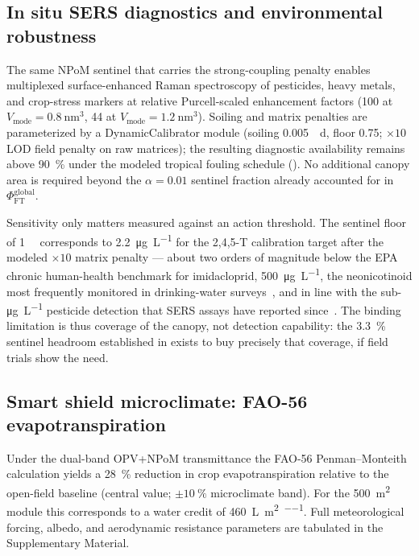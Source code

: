 \documentclass[preprint,12pt]{elsarticle}
\begin{document}
\subsection{In situ SERS diagnostics and environmental robustness}
The same NPoM sentinel that carries the strong-coupling penalty enables multiplexed surface-enhanced Raman spectroscopy of pesticides, heavy metals, and crop-stress markers at relative Purcell-scaled enhancement factors (\num{100} at $V_{\mathrm{mode}} = \qty{0.8}{\nm\cubed}$, \num{44} at $V_{\mathrm{mode}} = \qty{1.2}{\nm\cubed}$). Soiling and matrix penalties are parameterized by a DynamicCalibrator module (soiling \qty{0.005}{\per\day}, floor \num{0.75}; $\times 10$ LOD field penalty on raw matrices); the resulting diagnostic availability remains above \qty{90}{\percent} under the modeled tropical fouling schedule (). No additional canopy area is required beyond the $\alpha=0.01$ sentinel fraction already accounted for in $\Phi_{\mathrm{FT}}^{\mathrm{global}}$.

Sensitivity only matters measured against an action threshold. The sentinel floor of \qty{1}{\nano\molar} corresponds to \SI{2.2}{\micro\gram\per\liter} for the 2,4,5-T calibration target after the modeled $\times 10$ matrix penalty --- about two orders of magnitude below the EPA chronic human-health benchmark for imidacloprid, \SI{500}{\micro\gram\per\liter}, the neonicotinoid most frequently monitored in drinking-water surveys~\cite{EPA2021}, and in line with the sub-\si{\micro\gram\per\liter} pesticide detection that SERS assays have reported since~\cite{Xu2017}. The binding limitation is thus coverage of the canopy, not detection capability: the \qty{3.3}{\percent} sentinel headroom established in  exists to buy precisely that coverage, if field trials show the need.

\subsection{Smart shield microclimate: FAO-56 evapotranspiration}
Under the dual-band OPV+NPoM transmittance the FAO-56 Penman--Monteith calculation yields a \qty{28}{\percent} reduction in crop evapotranspiration relative to the open-field baseline (central value; $\pm\qty{10}{\percent}$ microclimate band). For the \qty{500}{\m\squared} module this corresponds to a water credit of \qty{460}{\L\per\m\squared\per\yr}. Full meteorological forcing, albedo, and aerodynamic resistance parameters are tabulated in the Supplementary Material.
\end{document}
